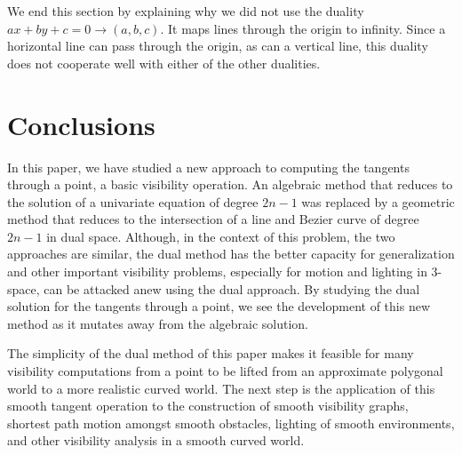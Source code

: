\documentclass[twocolumn,10pt]{article}
\begin{document}
We end this section by explaining why we did not use the duality 
$ax+by+c=0 \rightarrow (a,b,c)$.
It maps lines through the origin to infinity.
Since a horizontal line can pass through the origin,
as can a vertical line, this duality does not cooperate well with either of
the other dualities.

\section{Conclusions}
\label{sec:comparison}

In this paper, we have studied a new approach to computing the tangents
through a point, a basic visibility operation.
An algebraic method that reduces to the solution of a univariate equation of degree $2n-1$
was replaced by a geometric method that reduces to the intersection
of a line and Bezier curve of degree $2n-1$ in dual space.
Although, in the context of this problem, the two approaches are similar,
the dual method has the better capacity for generalization and
other important visibility problems, especially for motion and lighting in 
3-space, can be attacked anew using the dual approach.
By studying the dual solution for the tangents through a point,
we see the development of this new method as it mutates away from the
algebraic solution.

The simplicity of the dual method of this paper makes it feasible
for many visibility computations from a point to be lifted from an approximate
polygonal world to a more realistic curved world.
The next step is the application of this smooth tangent operation 
to the construction of smooth visibility graphs, shortest path motion
amongst smooth obstacles, lighting of smooth environments,
and other visibility analysis in a smooth curved world.
\end{document}
